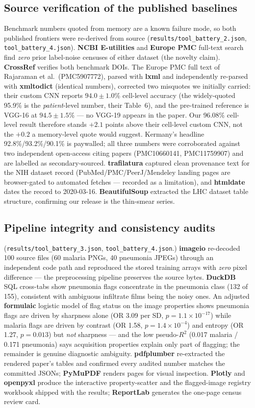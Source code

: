 \subsection{Source verification of the published baselines}
Benchmark numbers quoted from memory are a known failure mode, so both
published frontiers were re-derived from source
(\texttt{results/tool\_battery\_2.json}, \texttt{tool\_battery\_4.json}).
\textbf{NCBI E-utilities} and \textbf{Europe PMC} full-text search find
\emph{zero} prior label-noise censuses of either dataset (the novelty
claim). \textbf{CrossRef} verifies both benchmark DOIs. The Europe PMC
full text of Rajaraman et al.\ (PMC5907772), parsed with \textbf{lxml}
and independently re-parsed with \textbf{xmltodict} (identical numbers),
corrected two misquotes we initially carried: their custom CNN reports
$94.0 \pm 1.0$\% cell-level accuracy (the widely-quoted 95.9\% is the
\emph{patient}-level number, their Table~6), and the pre-trained
reference is VGG-16 at $94.5 \pm 1.5$\% --- no VGG-19 appears in the
paper. Our 96.08\% cell-level result therefore stands $+2.1$ points
above their cell-level custom CNN, not the $+0.2$ a memory-level quote
would suggest. Kermany's headline 92.8\%/93.2\%/90.1\% is paywalled;
all three numbers were corroborated against two independent open-access
citing papers (PMC10660141, PMC11759907) and are labelled as
secondary-sourced. \textbf{trafilatura} captured clean provenance text
for the NIH dataset record (PubMed/PMC/PeerJ/Mendeley landing pages are
browser-gated to automated fetches --- recorded as a limitation), and
\textbf{htmldate} dates the record to 2020-03-16. \textbf{BeautifulSoup}
extracted the LHC dataset table structure, confirming our release is the
thin-smear series.
\subsection{Pipeline integrity and consistency audits}
(\texttt{results/tool\_battery\_3.json}, \texttt{tool\_battery\_4.json}.)
\textbf{imageio} re-decoded 100 source files (60 malaria PNGs, 40
pneumonia JPEGs) through an independent code path and reproduced the
stored training arrays with \emph{zero} pixel difference --- the
preprocessing pipeline preserves the source bytes. \textbf{DuckDB} SQL
cross-tabs show pneumonia flags concentrate in the pneumonia class
(132 of 155), consistent with ambiguous infiltrate films being the noisy
ones. An adjusted \textbf{formulaic} logistic model of flag status on
the image properties shows pneumonia flags are driven by sharpness alone
(OR 3.09 per SD, $p{=}1.1{\times}10^{-17}$) while malaria flags are
driven by contrast (OR 1.58, $p{=}1.4{\times}10^{-4}$) and entropy
(OR 1.27, $p{=}0.013$) but \emph{not} sharpness --- and the low
pseudo-$R^2$ (0.017 malaria / 0.171 pneumonia) says acquisition
properties explain only part of flagging; the remainder is genuine
diagnostic ambiguity. \textbf{pdfplumber} re-extracted the rendered
paper's tables and confirmed every audited number matches the committed
JSONs; \textbf{PyMuPDF} renders pages for visual inspection.
\textbf{Plotly} and \textbf{openpyxl} produce the interactive
property-scatter and the flagged-image registry workbook shipped with
the results; \textbf{ReportLab} generates the one-page census review
card.

